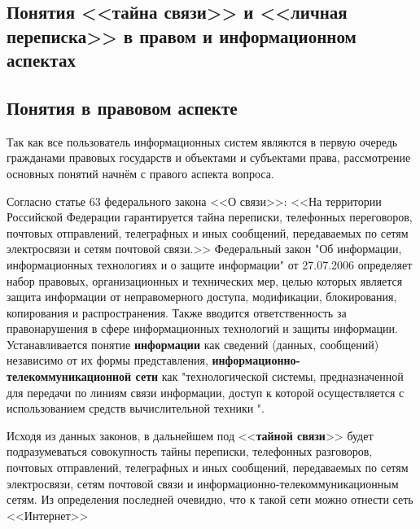 \parindent=1cm %
\begin{center}
		
		\section{Понятия <<тайна связи>> и <<личная переписка>> в правом и информационном аспектах}
		
\end{center}

\subsection{Понятия в правовом аспекте} 

Так как все пользователь информационных систем являются в первую очередь гражданами правовых государств и объектами и субъектами права, рассмотрение основных понятий начнём с правого аспекта вопроса.

Согласно статье 63 федерального закона <<О связи>>: %
<<На территории Российской Федерации гарантируется тайна переписки, телефонных переговоров, почтовых отправлений, телеграфных и иных сообщений, передаваемых по сетям электросвязи и сетям почтовой связи.>> 
Федеральный закон "Об информации, информационных технологиях и о защите информации" от 27.07.2006 
определяет набор правовых, организационных и технических мер,  целью которых является  защита информации от неправомерного доступа, модификации, блокирования, копирования и распространения. Также вводится ответственность за правонарушения в сфере информационных технологий и защиты информации.  Устанавливается понятие \textbf{информации} как сведений (данных, сообщений) независимо от их формы представления, \textbf{информационно-телекоммуникационной сети } как "технологической системы, предназначенной для передачи по линиям связи информации, доступ к которой осуществляется с использованием средств вычислительной техники ". 

Исходя из данных законов, в дальнейшем под <<\textbf{тайной связи}>>  будет подразумеваться совокупность тайны переписки, телефонных разговоров, почтовых отправлений, телеграфных и иных сообщений, передаваемых по сетям электросвязи, сетям почтовой связи и информационно-телекоммуникационным сетям.  Из определения последней очевидно, что к такой сети  можно отнести сеть <<Интернет>>


